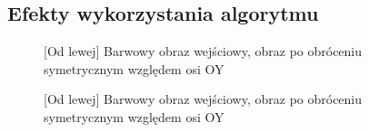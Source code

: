 \documentclass[a4paper,12pt, titlepage]{report}
\begin{document}
\subsection*{Efekty wykorzystania algorytmu}
\begin{figure}[h]
    \centering
    \caption{[Od lewej] Barwowy obraz wejściowy, obraz po obróceniu symetrycznym względem osi OY}%
    \label{fig:geo_after_grey1}%
\end{figure}
\FloatBarrier
\begin{figure}[h]
    \centering
    \caption{[Od lewej] Barwowy obraz wejściowy, obraz po obróceniu symetrycznym względem osi OY}%
    \label{fig:geo_after_grey1}%
\end{figure}
\FloatBarrier
\end{document}
